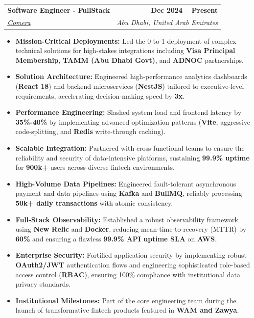 \documentclass[letterpaper,12pt]{article}
\makeatletter
\newcommand{\resumeItem}[1]{
  \item\small{
    {#1}
  }
}
\newcommand{\resumeSubheading}[4]{
  \vspace{4pt}\item
    \begin{tabular*}{1.0\textwidth}[t]{l@{\extracolsep{\fill}}r}
      \textbf{#1} & \textbf{\small #2} \\
      \textit{\small#3} & \textit{\small #4} \\
    \end{tabular*}\vspace{2pt}
}
\newcommand{\resumeItemListStart}{\begin{itemize}}
\newcommand{\resumeItemListEnd}{\end{itemize}\vspace{-2pt}}
\makeatother
\begin{document}
    \resumeSubheading
      {Software Engineer - FullStack}{Dec 2024 -- Present}
      {\href{https://mycomera.com/}{Comera}}{Abu Dhabi, United Arab Emirates}
      \resumeItemListStart
        \resumeItem{\textbf{Mission-Critical Deployments:} Led the 0-to-1 deployment of complex technical solutions for high-stakes integrations including \textbf{Visa Principal Membership}, \textbf{TAMM (Abu Dhabi Govt)}, and \textbf{ADNOC} partnerships.}
        \resumeItem{\textbf{Solution Architecture:} Engineered high-performance analytics dashboards (\textbf{React 18}) and backend microservices (\textbf{NestJS}) tailored to executive-level requirements, accelerating decision-making speed by \textbf{3x}.}
        \resumeItem{\textbf{Performance Engineering:} Slashed system load and frontend latency by \textbf{35\%-40\%} by implementing advanced optimization patterns (\textbf{Vite}, aggressive code-splitting, and \textbf{Redis} write-through caching).}
        \resumeItem{\textbf{Scalable Integration:} Partnered with cross-functional teams to ensure the reliability and security of data-intensive platforms, sustaining \textbf{99.9\% uptime} for \textbf{900k+} users across diverse fintech environments.}
        \resumeItem{\textbf{High-Volume Data Pipelines:} Engineered fault-tolerant asynchronous payment and data pipelines using \textbf{Kafka} and \textbf{BullMQ}, reliably processing \textbf{50k+ daily transactions} with atomic consistency.}
        \resumeItem{\textbf{Full-Stack Observability:} Established a robust observability framework using \textbf{New Relic} and \textbf{Docker}, reducing mean-time-to-recovery (MTTR) by \textbf{60\%} and ensuring a flawless \textbf{99.9\% API uptime SLA} on \textbf{AWS}.}
        \resumeItem{\textbf{Enterprise Security:} Fortified application security by implementing robust \textbf{OAuth2/JWT} authentication flows and engineering sophisticated role-based access control (\textbf{RBAC}), ensuring 100\% compliance with institutional data privacy standards.}
        \resumeItem{\textbf{\href{https://jaseem8.github.io/\#comera}{Institutional Milestones:}} Part of the core engineering team during the launch of transformative fintech products featured in \textbf{WAM and Zawya}.}
      \resumeItemListEnd
\end{document}
